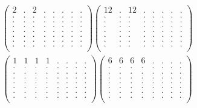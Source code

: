 \documentclass[12pt,a4paper]{amsart}
\begin{document}
\begin{align*}
\left(\begin{array}{rrrrrrrr}%
2&.&2&.&.&.&.&.\\%
.&.&.&.&.&.&.&.\\%
.&.&.&.&.&.&.&.\\%
.&.&.&.&.&.&.&.\\%
.&.&.&.&.&.&.&.\\%
.&.&.&.&.&.&.&.\\%
.&.&.&.&.&.&.&.\\%
.&.&.&.&.&.&.&.\\%
\end{array}\right)%
\left(\begin{array}{rrrrrrrr}%
12&.&12&.&.&.&.&.\\%
.&.&.&.&.&.&.&.\\%
.&.&.&.&.&.&.&.\\%
.&.&.&.&.&.&.&.\\%
.&.&.&.&.&.&.&.\\%
.&.&.&.&.&.&.&.\\%
.&.&.&.&.&.&.&.\\%
.&.&.&.&.&.&.&.\\%
\end{array}\right)%
\end{align*}
\begin{align*}
\left(\begin{array}{rrrrrrrr}%
1&1&1&1&.&.&.&.\\%
.&.&.&.&.&.&.&.\\%
.&.&.&.&.&.&.&.\\%
.&.&.&.&.&.&.&.\\%
.&.&.&.&.&.&.&.\\%
.&.&.&.&.&.&.&.\\%
.&.&.&.&.&.&.&.\\%
.&.&.&.&.&.&.&.\\%
\end{array}\right)%
\left(\begin{array}{rrrrrrrr}%
6&6&6&6&.&.&.&.\\%
.&.&.&.&.&.&.&.\\%
.&.&.&.&.&.&.&.\\%
.&.&.&.&.&.&.&.\\%
.&.&.&.&.&.&.&.\\%
.&.&.&.&.&.&.&.\\%
.&.&.&.&.&.&.&.\\%
.&.&.&.&.&.&.&.\\%
\end{array}\right)%
\end{align*}
\end{document}
